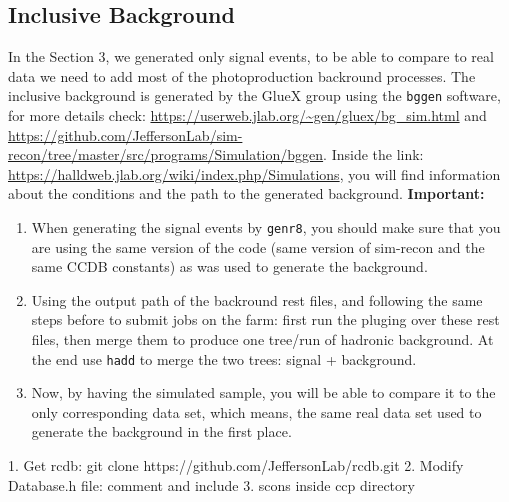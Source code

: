 \documentclass{article}
\begin{document}
\subsection{Inclusive Background}
In the Section 3, we generated only signal events, to be able to compare to real data we need to add most of the photoproduction backround processes. The inclusive background is generated by the GlueX group using the \texttt{bggen} software, for more details check: \url{https://userweb.jlab.org/~gen/gluex/bg_sim.html} and \url{https://github.com/JeffersonLab/sim-recon/tree/master/src/programs/Simulation/bggen}.
\newline Inside the link: \url{https://halldweb.jlab.org/wiki/index.php/Simulations}, you will find information about the conditions and the path to the generated background.
\bigbreak
\textbf{Important:}
\begin{enumerate}
\item When generating the signal events by \texttt{genr8}, you should make sure that you are using the same version of the code (same version of sim-recon and the same CCDB constants) as was used to generate the background.
\item Using the output path of the backround rest files, and following the same steps before to submit jobs on the farm: first run the pluging over these rest files, then merge them to produce one tree/run of hadronic background. At the end use \texttt{hadd} to merge the two trees: signal + background.
\item Now, by having the simulated sample, you will be able to compare it to the only corresponding data set, which means, the same real data set used to generate the background in the first place. 
\end{enumerate}

1. Get rcdb:  git clone https://github.com/JeffersonLab/rcdb.git
2. Modify Database.h file: comment and include
3. scons inside ccp directory
\end{document}
